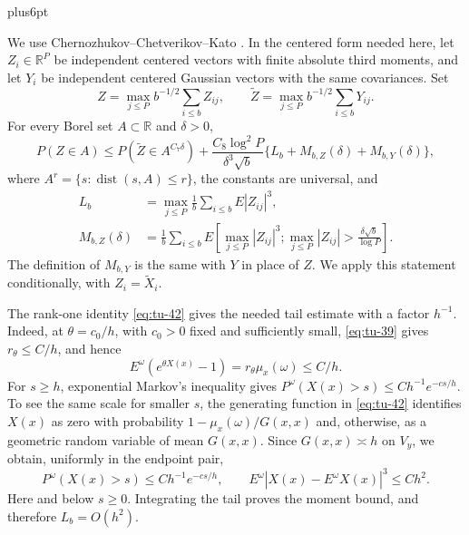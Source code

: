 \documentclass[12pt,reqno]{amsart}
\makeatletter
\theoremstyle{plain}
\theoremstyle{definition}
\theoremstyle{remark}
\renewenvironment{proof}[1][\proofname]{%
  \par
  \pushQED{\qed}%
  \normalfont
  \topsep6pt plus6pt\relax
  \trivlist
  \item[\hskip\labelsep\slshape #1\@addpunct{.}]%
  \ignorespaces
}{%
  \popQED
  \endtrivlist
  \@endpefalse
}
\DeclareRobustCommand{\qed}{%
  \leavevmode\unskip\penalty9999\hbox{}\nobreak
  \ifmmode
    \makebox[0pt][l]{\qquad\hbox{\qedsymbol}}%
  \else
    \qquad\hbox{\qedsymbol}%
  \fi
}
\renewcommand{\qedsymbol}{\rule[.47pt]{4pt}{6pt}}
\numberwithin{equation}{section}
\makeatother
\begin{document}
\begin{proof}
We use Chernozhukov--Chetverikov--Kato
\cite[Theorem~3.1]{CCK2016}.  In the centered form needed here, let
$Z_i\in\mathbb R^P$ be independent centered vectors with finite
absolute third moments, and let $Y_i$ be independent centered
Gaussian vectors with the same covariances.  Set
\[
 Z=\max_{j\le P}b^{-1/2}\sum_{i\le b}Z_{ij},\qquad
 \widetilde Z=\max_{j\le P}b^{-1/2}\sum_{i\le b}Y_{ij}.
\]
For every Borel set $A\subset\mathbb R$ and $\delta>0$,
\begin{equation}
 P(Z\in A)\le P(\widetilde Z\in A^{C_7\delta})
 +\frac{C_8\log^2P}{\delta^3\sqrt b}
   \{L_b+M_{b,Z}(\delta)+M_{b,Y}(\delta)\},
 \label{eq:terminal-cck}
\end{equation}
where $A^r=\{s:\operatorname{dist}(s,A)\le r\}$, the constants
are universal, and
\[
 \begin{split}
 L_b&=\max_{j\le P}\frac1b\sum_{i\le b}E|Z_{ij}|^3,\\
 M_{b,Z}(\delta)
 &=\frac1b\sum_{i\le b}E\left[
   \max_{j\le P}|Z_{ij}|^3;
   \max_{j\le P}|Z_{ij}|>\frac{\delta\sqrt b}{\log P}\right].
 \end{split}
\]
The definition of $M_{b,Y}$ is the same with $Y$ in place of $Z$.
We apply this statement conditionally, with $Z_i=\widetilde X_i$.

The rank-one identity \eqref{eq:tu-42} gives the needed tail estimate with a
factor $h^{-1}$.  Indeed, at $\theta=c_0/h$, with $c_0>0$ fixed
and sufficiently small, \eqref{eq:tu-39} gives $r_\theta\le C/h$, and hence
\[
 E^\omega(e^{\theta X(x)}-1)
 =r_\theta\mu_x(\omega)\le C/h.
\]
For $s\ge h$, exponential Markov's inequality gives
$P^\omega(X(x)>s)\le Ch^{-1}e^{-cs/h}$.  To see the same scale
for smaller $s$, the generating function in \eqref{eq:tu-42} identifies
$X(x)$ as zero with probability $1-\mu_x(\omega)/G(x,x)$ and,
otherwise, as a geometric random variable of mean $G(x,x)$.
Since $G(x,x)\asymp h$ on $V_y$, we obtain, uniformly in the
endpoint pair,
\begin{equation}
 P^\omega(X(x)>s)\le Ch^{-1}e^{-cs/h},\qquad
 E^\omega|X(x)-E^\omega X(x)|^3\le Ch^2.
 \label{eq:terminal-bridge-tails}
\end{equation}
Here and below $s\ge0$.  Integrating the tail proves the moment
bound, and therefore $L_b=O(h^2)$.


\end{proof}
\end{document}
